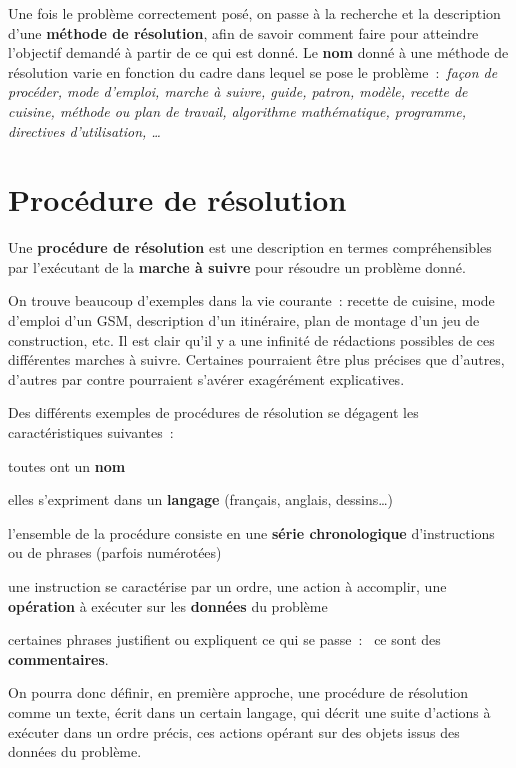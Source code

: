 		Une fois le problème correctement posé, on passe à la recherche et la
		description d’une \textbf{méthode de résolution}, afin de savoir
		comment faire pour atteindre l’objectif demandé à partir de ce qui est
		donné. Le \textbf{nom} donné à une méthode de résolution varie en
		fonction du cadre dans lequel se pose le problème~:~\textit{façon de
		procéder, mode d’emploi, marche à suivre, guide, patron, modèle,
		recette de cuisine, méthode ou plan de travail, algorithme
		mathématique, programme, directives d’utilisation, \dots}

\section{Procédure de résolution}

	Une \textbf{procédure de résolution} est une description en termes
	compréhensibles par l’exécutant de la \textbf{marche à
	suivre} pour résoudre un problème donné.
	
	On trouve beaucoup d’exemples dans la vie courante~:
	recette de cuisine, mode d’emploi d’un GSM, description d’un
	itinéraire, plan de montage d’un jeu de construction, etc. Il est clair
	qu’il y a une infinité de rédactions possibles de ces différentes
	marches à suivre. Certaines pourraient être plus précises que d’autres,
	d’autres par contre pourraient s’avérer exagérément explicatives.
	
	Des différents exemples de procédures de résolution se dégagent les
	caractéristiques suivantes~:

	\begin{liste}
	\item toutes ont un \textbf{nom}
	\item elles s’expriment dans un \textbf{langage}
		(français, anglais, dessins\dots)
	\item l’ensemble de la procédure consiste 
		en une \textbf{série chronologique}
		d’instructions ou de phrases (parfois numérotées)
	\item une instruction se caractérise par un ordre, 
		une action à accomplir,
		une \textbf{opération} à exécuter sur les \textbf{données} du problème
	\item certaines phrases justifient ou expliquent ce qui se passe~:~
		ce sont des \textbf{commentaires}.
	\end{liste}

	On pourra donc définir, en première approche, une procédure de
	résolution comme un texte, écrit dans un certain langage, qui décrit
	une suite d’actions à exécuter dans un ordre précis, ces actions
	opérant sur des objets issus des données du problème.

